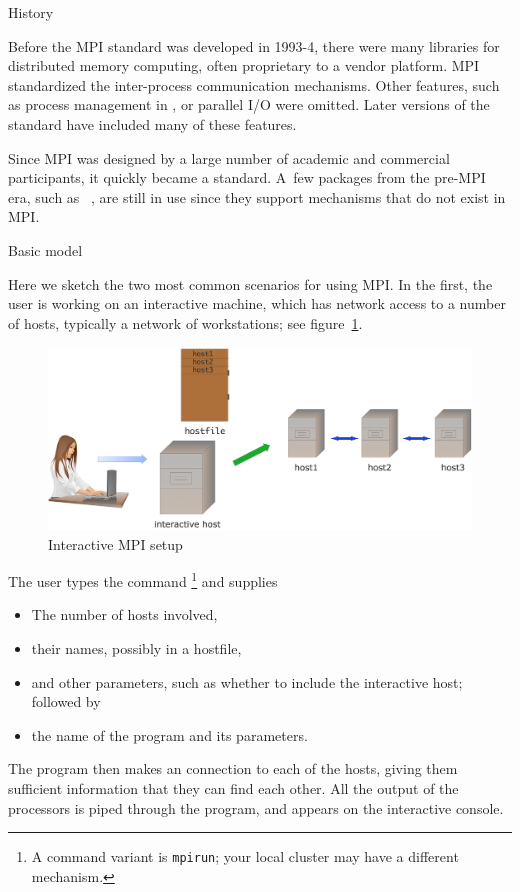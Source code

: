  {History}

Before the MPI standard was developed in 1993-4, there were many
libraries for distributed memory computing, often proprietary
to a vendor platform. MPI standardized the inter-process communication
mechanisms. Other features, such as process management in ,
or parallel I/O were omitted. Later versions of the standard
have included many of these features.

Since MPI was designed by a large number of academic and commercial
participants, it quickly became a standard. A~few packages
from the pre-MPI era, such as ~\cite{charmpp},
are still in use since they support mechanisms that do not exist
in MPI.

 {Basic model}
\label{sec:mpiexec}

Here we sketch the two most common scenarios for using MPI. In the
first, the user is working on an interactive machine, which has
network access to a number of hosts, typically a network of workstations;
see figure~\ref{fig:mpi-interactive}.
\begin{figure}[ht]
  \includegraphics[scale=.12]{graphics/mpi-interactive}
  \caption{Interactive MPI setup}
  \label{fig:mpi-interactive}
\end{figure}
The user types the command \footnote
{A command variant is \texttt{mpirun}; your local cluster
  may have a different mechanism.}
and supplies
\begin{itemize}
\item The number of hosts involved,
\item their names, possibly in a hostfile,
\item and other parameters, such as whether to include the interactive
  host; followed by
\item the name of the program and its parameters.
\end{itemize}
The  program then makes an  connection
to each of the hosts, giving them sufficient information that they 
can find each other. All the output of the processors is piped through the 
 program, and appears on the interactive console.

